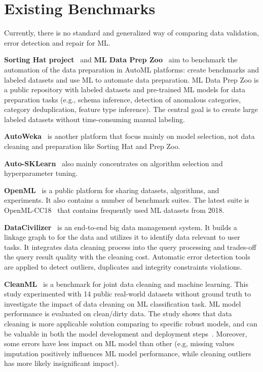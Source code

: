 
\section{Existing Benchmarks}
\label{sec:existing_benchmarks}

Currently, there is no standard and generalized way of comparing data validation, error detection and repair for ML.

\textbf{Sorting Hat project}~\cite{sortinghat} and \textbf{ML Data Prep Zoo}~\cite{prepzoo} aim to benchmark the automation of the data preparation in AutoML platforms: create benchmarks and labeled datasets and use ML to automate data preparation.
ML Data Prep Zoo is a public repository with labeled datasets and pre-trained ML models for data preparation tasks (e.g., schema inference, detection of anomalous categories, category deduplication, feature type inference).
The central goal is to create large labeled datasets without time-consuming manual labeling.

\textbf{AutoWeka}~\cite{autoweka} is another platform that focus mainly on model selection, not data cleaning and preparation like Sorting Hat and Prep Zoo.

\textbf{Auto-SKLearn}~\cite{autosklearn} also mainly concentrates on algorithm selection and hyperparameter tuning.


\textbf{OpenML}~\cite{openml_suites} is a public platform for sharing datasets, algorithms, and experiments. It also contains a number of benchmark suites. The latest suite is OpenML-CC18~\cite{openml_suites} that contains frequently used ML datasets from 2018.

\textbf{DataCivilizer}~\cite{datacivil} is an end-to-end big data management system. 
It builds a linkage graph to for the data and utilizes it to identify data relevant to user tasks. 
It integrates data cleaning process into the query processing and trades-off the query result quality with the cleaning cost. 
Automatic error detection tools are applied to detect outliers, duplicates and integrity constraints violations.

\textbf{CleanML}~\cite{cleanml} is a benchmark for joint data cleaning and machine learning.
This study experimented with 14 public real-world datasets without ground truth to investigate the impact of data cleaning on ML classification task. 
ML model performance is evaluated on clean/dirty data.
The study shows that data cleaning is more applicable solution comparing to specific robust models, and can be valuable in both the model development and deployment steps~\cite{cleanml}.
Moreover, some errors have less impact on ML model than other (e.g, missing values imputation positively influences ML model performance, while cleaning outliers has more likely insignificant impact). 


